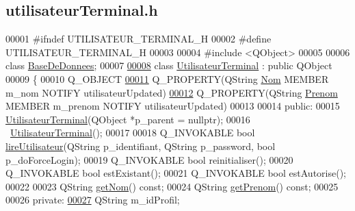 \hypertarget{utilisateur_terminal_8h_source}{}\subsection{utilisateur\+Terminal.\+h}
\label{utilisateur_terminal_8h_source}

\begin{DoxyCode}
00001 \textcolor{preprocessor}{#ifndef UTILISATEUR\_TERMINAL\_H}
00002 \textcolor{preprocessor}{#define UTILISATEUR\_TERMINAL\_H}
00003 
00004 \textcolor{preprocessor}{#include <QObject>}
00005 
00006 \textcolor{keyword}{class }\hyperlink{class_base_de_donnees}{BaseDeDonnees};
00007 
\hyperlink{class_utilisateur_terminal}{00008} \textcolor{keyword}{class }\hyperlink{class_utilisateur_terminal}{UtilisateurTerminal} : \textcolor{keyword}{public} QObject
00009 \{
00010     Q\_OBJECT
\hyperlink{class_utilisateur_terminal_a92c24246effeafa1a9ea0923f13c20e8}{00011}     Q\_PROPERTY(QString \hyperlink{class_utilisateur_terminal_a92c24246effeafa1a9ea0923f13c20e8}{Nom} MEMBER m\_nom NOTIFY utilisateurUpdated)
\hyperlink{class_utilisateur_terminal_a42d3d48105b486ce0fd89bcef40f8573}{00012}     Q\_PROPERTY(QString \hyperlink{class_utilisateur_terminal_a42d3d48105b486ce0fd89bcef40f8573}{Prenom} MEMBER m\_prenom NOTIFY utilisateurUpdated)
00013 
00014 public:
00015     \hyperlink{class_utilisateur_terminal}{UtilisateurTerminal}(QObject *p\_parent = \textcolor{keywordtype}{nullptr});
00016     ~\hyperlink{class_utilisateur_terminal}{UtilisateurTerminal}();
00017 
00018     Q\_INVOKABLE \textcolor{keywordtype}{bool} \hyperlink{class_utilisateur_terminal_a196420ecc14bc0645e3e1c66d796b8e6}{lireUtilisateur}(QString p\_identifiant, QString p\_password, \textcolor{keywordtype}{bool} 
      p\_doForceLogin);
00019     Q\_INVOKABLE \textcolor{keywordtype}{bool} reinitialiser();
00020     Q\_INVOKABLE \textcolor{keywordtype}{bool} estExistant();
00021     Q\_INVOKABLE \textcolor{keywordtype}{bool} estAutorise();
00022 
00023     QString \hyperlink{class_utilisateur_terminal_a6432e5c3b9a732ef9312f67718648bf1}{getNom}() const;
00024     QString \hyperlink{class_utilisateur_terminal_ac38fe2414a0dcb53d0f283f231dcba01}{getPrenom}() const;
00025 
00026 private:
\hyperlink{class_utilisateur_terminal_af3d06352ecbd2d4439626b4ba53b55be}{00027}     QString m\_idProfil;

\end{DoxyCode}
